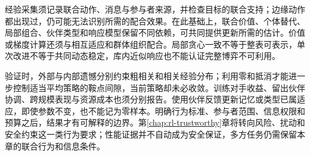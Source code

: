 经验采集须记录联合动作、消息与参与者来源，并检查目标的联合支持；边缘动作都出现过，仍可能无法识别所需的配合效果。在此基础上，联合价值、个体替代、局部组合、伙伴类型和响应模型保留不同依赖，可共同提供更新所需的估计。价值或梯度计算还须与相互适应和群体组织配合。局部贪心一致不等于整表可表示，单次改进不等于共同动态稳定，库内近似响应也不能认证完整博弈不可利用。

验证时，外部与内部遗憾分别约束粗相关和相关经验分布；利用零和抵消才能进一步控制适当平均策略的鞍点间隙，当前策略却未必收敛。训练对手收益、留出伙伴协调、跨规模表现与资源成本也须分别报告。使用伙伴反馈更新记忆或类型已属适应，即使参数不变，也不能记为零样本。明确行为标准、参与者范围、信息权限和预算之后，结果才有可解释的边界。第\ref{chap:rl-trustworthy}章将转向风险、扰动和安全约束这一类行为要求；性能证据并不自动成为安全保证，多方任务仍需保留本章的联合行为和信息条件。

